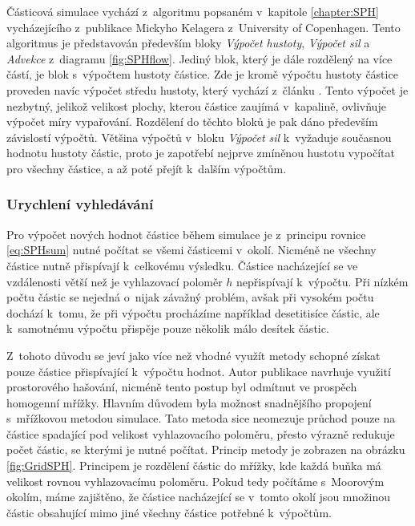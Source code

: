 Částicová simulace vychází z~algoritmu popsaném v~kapitole \ref{chapter:SPH} vycházejícího z~publikace \cite{KelagerSPH} Mickyho Kelagera z~University of Copenhagen. Tento algoritmus je představován především bloky \textit{Výpočet hustoty}, \textit{Výpočet sil} a \textit{Advekce} z~diagramu \ref{fig:SPHflow}. Jediný blok, který je dále rozdělený na více částí, je blok s~výpočtem hustoty částice. Zde je kromě výpočtu hustoty částice proveden navíc výpočet středu hustoty, který vychází z~článku \cite{sufaceSPH}. Tento výpočet je nezbytný, jelikož velikost plochy, kterou částice zaujímá v~kapalině, ovlivňuje výpočet míry vypařování. Rozdělení do těchto bloků je pak dáno především závislostí výpočtů. Většina výpočtů v~bloku \textit{Výpočet sil} k~vyžaduje současnou hodnotu hustoty částic, proto je zapotřebí nejprve zmíněnou hustotu vypočítat pro všechny částice, a až poté přejít k~dalším výpočtům.

\subsubsection{Urychlení vyhledávání}
Pro výpočet nových hodnot částice během simulace je z~principu rovnice \ref{eq:SPHsum} nutné počítat se všemi částicemi v~okolí. Nicméně ne všechny částice nutně přispívají k~celkovému výsledku. Částice nacházející se ve vzdálenosti větší než je vyhlazovací poloměr $h$ nepřispívají k~výpočtu. Při nízkém počtu částic se nejedná o~nijak závažný problém, avšak při vysokém počtu dochází k~tomu, že při výpočtu procházíme například desetitisíce částic, ale k~samotnému výpočtu přispěje pouze několik málo desítek částic. 

Z~tohoto důvodu se jeví jako více než vhodné využít metody schopné získat pouze částice přispívající k~výpočtu hodnot. Autor publikace \cite{KelagerSPH} navrhuje využití prostorového hašování, nicméně tento postup byl odmítnut ve prospěch homogenní mřížky. Hlavním důvodem byla možnost snadnějšího propojení s~mřížkovou metodou simulace. Tato metoda sice neomezuje průchod pouze na částice spadající pod velikost vyhlazovacího poloměru, přesto výrazně redukuje počet částic, se kterými je nutné počítat. Princip metody je zobrazen na obrázku \ref{fig:GridSPH}. Principem je rozdělení částic do mřížky, kde každá buňka má velikost rovnou vyhlazovacímu poloměru. Pokud tedy počítáme s~Moorovým okolím, máme zajištěno, že částice nacházející se v~tomto okolí jsou množinou částic obsahující mimo jiné všechny částice potřebné k~výpočtům.


